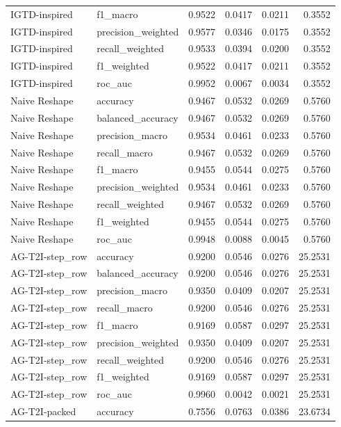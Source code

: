 \begin{tabular}{llrrrr}
IGTD-inspired & f1_macro & 0.9522 & 0.0417 & 0.0211 & 0.3552 \\
IGTD-inspired & precision_weighted & 0.9577 & 0.0346 & 0.0175 & 0.3552 \\
IGTD-inspired & recall_weighted & 0.9533 & 0.0394 & 0.0200 & 0.3552 \\
IGTD-inspired & f1_weighted & 0.9522 & 0.0417 & 0.0211 & 0.3552 \\
IGTD-inspired & roc_auc & 0.9952 & 0.0067 & 0.0034 & 0.3552 \\
Naive Reshape & accuracy & 0.9467 & 0.0532 & 0.0269 & 0.5760 \\
Naive Reshape & balanced_accuracy & 0.9467 & 0.0532 & 0.0269 & 0.5760 \\
Naive Reshape & precision_macro & 0.9534 & 0.0461 & 0.0233 & 0.5760 \\
Naive Reshape & recall_macro & 0.9467 & 0.0532 & 0.0269 & 0.5760 \\
Naive Reshape & f1_macro & 0.9455 & 0.0544 & 0.0275 & 0.5760 \\
Naive Reshape & precision_weighted & 0.9534 & 0.0461 & 0.0233 & 0.5760 \\
Naive Reshape & recall_weighted & 0.9467 & 0.0532 & 0.0269 & 0.5760 \\
Naive Reshape & f1_weighted & 0.9455 & 0.0544 & 0.0275 & 0.5760 \\
Naive Reshape & roc_auc & 0.9948 & 0.0088 & 0.0045 & 0.5760 \\
AG-T2I-step_row & accuracy & 0.9200 & 0.0546 & 0.0276 & 25.2531 \\
AG-T2I-step_row & balanced_accuracy & 0.9200 & 0.0546 & 0.0276 & 25.2531 \\
AG-T2I-step_row & precision_macro & 0.9350 & 0.0409 & 0.0207 & 25.2531 \\
AG-T2I-step_row & recall_macro & 0.9200 & 0.0546 & 0.0276 & 25.2531 \\
AG-T2I-step_row & f1_macro & 0.9169 & 0.0587 & 0.0297 & 25.2531 \\
AG-T2I-step_row & precision_weighted & 0.9350 & 0.0409 & 0.0207 & 25.2531 \\
AG-T2I-step_row & recall_weighted & 0.9200 & 0.0546 & 0.0276 & 25.2531 \\
AG-T2I-step_row & f1_weighted & 0.9169 & 0.0587 & 0.0297 & 25.2531 \\
AG-T2I-step_row & roc_auc & 0.9960 & 0.0042 & 0.0021 & 25.2531 \\
AG-T2I-packed & accuracy & 0.7556 & 0.0763 & 0.0386 & 23.6734 \\

\end{tabular}
